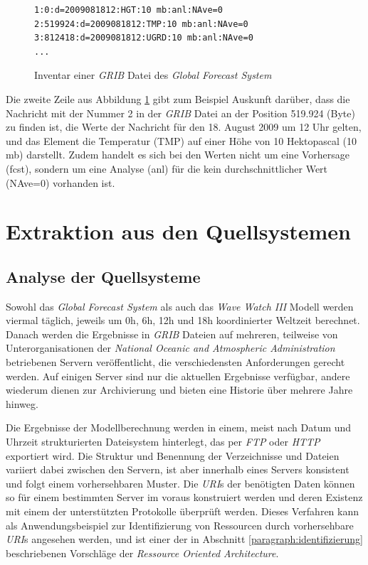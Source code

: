 \begin{figure}[h]
\begin{Verbatim}[frame=lines,framerule=0.5pt,framesep=3mm]
1:0:d=2009081812:HGT:10 mb:anl:NAve=0
2:519924:d=2009081812:TMP:10 mb:anl:NAve=0
3:812418:d=2009081812:UGRD:10 mb:anl:NAve=0
...
\end{Verbatim}
  \caption{Inventar einer \textit{GRIB} Datei des \textit{Global
      Forecast System} }
  \label{abbildung:inventar}
\end{figure}

Die zweite Zeile aus Abbildung \ref{abbildung:inventar} gibt zum
Beispiel Auskunft darüber, dass die Nachricht mit der Nummer 2 in der
\textit{GRIB} Datei an der Position 519.924 (Byte) zu finden ist, die
Werte der Nachricht für den 18. August 2009 um 12 Uhr gelten, und das
Element die Temperatur (TMP) auf einer Höhe von 10 Hektopascal (10 mb)
darstellt. Zudem handelt es sich bei den Werten nicht um eine
Vorhersage (fcst), sondern um eine Analyse (anl) für die kein
durchschnittlicher Wert (NAve=0) vorhanden ist.

\section{Extraktion aus den Quellsystemen}

\subsection{Analyse der Quellsysteme}

Sowohl das \textit{Global Forecast System} als auch das \textit{Wave
  Watch III} Modell werden viermal täglich, jeweils um 0h, 6h, 12h und
18h koordinierter Weltzeit berechnet. Danach werden die Ergebnisse in
\textit{GRIB} Dateien auf mehreren, teilweise von Unterorganisationen
der \textit{National Oceanic and Atmospheric Administration}
betriebenen Servern veröffentlicht, die verschiedensten Anforderungen
gerecht werden. Auf einigen Server sind nur die aktuellen Ergebnisse
verfügbar, andere wiederum dienen zur Archivierung und bieten eine
Historie über mehrere Jahre hinweg.

Die Ergebnisse der Modellberechnung werden in einem, meist nach Datum
und Uhrzeit strukturierten Dateisystem hinterlegt, das per
\textit{FTP} oder \textit{HTTP} exportiert wird. Die Struktur und
Benennung der Verzeichnisse und Dateien variiert dabei zwischen den
Servern, ist aber innerhalb eines Servers konsistent und folgt einem
vorhersehbaren Muster. Die \textit{URI}s der benötigten Daten können
so für einem bestimmten Server im voraus konstruiert werden und deren
Existenz mit einem der unterstützten Protokolle überprüft
werden. Dieses Verfahren kann als Anwendungsbeispiel zur
Identifizierung von Ressourcen durch vorhersehbare \textit{URI}s
angesehen werden, und ist einer der in Abschnitt
\ref{paragraph:identifizierung} beschriebenen Vorschläge der
\textit{Ressource Oriented Architecture}.

